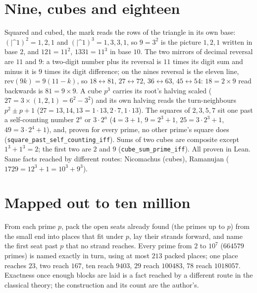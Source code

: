 \documentclass[11pt]{article}
\begin{document}
\section{Nine, cubes and eighteen}
Squared and cubed, the mark reads the rows of the triangle in its own base: $(|\text{\textasciicircum}1)^2 = 1,2,1$ and $(|\text{\textasciicircum}1)^3 = 1,3,3,1$, so $9 = 3^2$ is the picture $1,2,1$ written in base $2$, and $121 = 11^2$, $1331 = 11^3$ in base $10$. The two mirrors of decimal reversal are $11$ and $9$: a two-digit number plus its reversal is $11$ times its digit sum and minus it is $9$ times its digit difference; on the nines reversal is the eleven line, $\mathrm{rev}(9k) = 9(11-k)$, so $18\leftrightarrow81$, $27\leftrightarrow72$, $36\leftrightarrow63$, $45\leftrightarrow54$: $18 = 2\times9$ read backwards is $81 = 9\times9$. A cube $p^3$ carries its root's halving scaled ($27 = 3\times(1,2,1) = 6^2-3^2$) and its own halving reads the turn-neighbours $p^2\pm p+1$ ($27 = 13,14,13 = 1\cdot13, 2\cdot7, 1\cdot13$). The squares of $2, 3, 5, 7$ sit one past a self-counting number $2^a$ or $3\cdot2^a$ ($4 = 3+1$, $9 = 2^3+1$, $25 = 3\cdot2^3+1$, $49 = 3\cdot2^4+1$), and, proven for every prime, no other prime's square does (\texttt{square\_past\_self\_counting\_iff}). Sums of two cubes are composite except $1^3+1^3 = 2$; the first two are $2$ and $9$ (\texttt{cube\_sum\_prime\_iff}). All proven in Lean. Same facts reached by different routes: Nicomachus (cubes), Ramanujan ($1729 = 12^3+1 = 10^3+9^3$).

\section{Mapped out to ten million}
From each prime $p$, pack the open seats already found (the primes up to $p$) from the small end into places that fit under $p$, lay their strands forward, and name the first seat past $p$ that no strand reaches. Every prime from $2$ to $10^7$ ($664579$ primes) is named exactly in turn, using at most $213$ packed places; one place reaches $23$, two reach $167$, ten reach $9403$, $29$ reach $100483$, $78$ reach $1018057$. Exactness once enough blocks are laid is a fact reached by a different route in the classical theory; the construction and its count are the author's.
\end{document}
